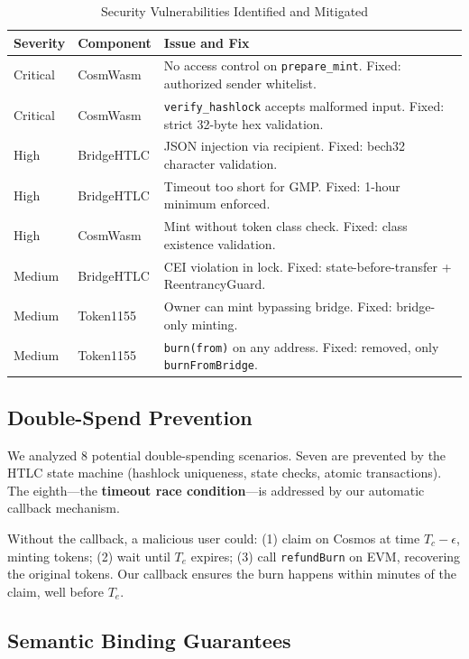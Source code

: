 \documentclass[conference,10pt]{IEEEtran}
\begin{document}
\begin{table}[t]
\centering
\caption{Security Vulnerabilities Identified and Mitigated}
\label{tab:security}
\footnotesize
\begin{tabular}{@{}llp{3.5cm}@{}}
\toprule
\textbf{Severity} & \textbf{Component} & \textbf{Issue and Fix} \\
\midrule
Critical & CosmWasm & No access control on \texttt{prepare\_mint}. Fixed: authorized sender whitelist. \\
Critical & CosmWasm & \texttt{verify\_hashlock} accepts malformed input. Fixed: strict 32-byte hex validation. \\
High & BridgeHTLC & JSON injection via recipient. Fixed: bech32 character validation. \\
High & BridgeHTLC & Timeout too short for GMP. Fixed: 1-hour minimum enforced. \\
High & CosmWasm & Mint without token class check. Fixed: class existence validation. \\
Medium & BridgeHTLC & CEI violation in lock. Fixed: state-before-transfer + ReentrancyGuard. \\
Medium & Token1155 & Owner can mint bypassing bridge. Fixed: bridge-only minting. \\
Medium & Token1155 & \texttt{burn(from)} on any address. Fixed: removed, only \texttt{burnFromBridge}. \\
\bottomrule
\end{tabular}
\end{table}

\subsection{Double-Spend Prevention}

We analyzed 8 potential double-spending scenarios. Seven are prevented by the HTLC state machine (hashlock uniqueness, state checks, atomic transactions). The eighth---the \textbf{timeout race condition}---is addressed by our automatic callback mechanism.

Without the callback, a malicious user could: (1) claim on Cosmos at time $T_c - \epsilon$, minting tokens; (2) wait until $T_e$ expires; (3) call \texttt{refundBurn} on EVM, recovering the original tokens. Our callback ensures the burn happens within minutes of the claim, well before $T_e$.

\subsection{Semantic Binding Guarantees}
\end{document}
